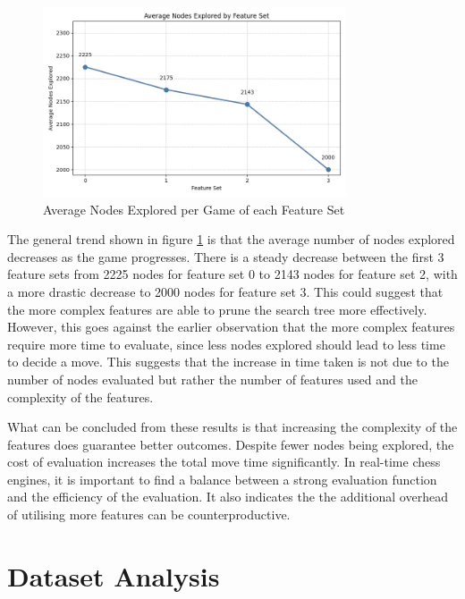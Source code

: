 \begin{figure}[H]
    \centering
    \includegraphics[width=0.8\textwidth]{images/plots/featureSet/Feature_set_vs_avg_nodes_explored.png}
    \caption{Average Nodes Explored per Game of each Feature Set}
    \label{fig: feature_set_vs_avg_nodes_explored}
\end{figure}

The general trend shown in figure \ref{fig: feature_set_vs_avg_nodes_explored} is that the average number of nodes explored decreases as the game progresses. There is a steady decrease between the first 3 feature sets from 2225 nodes for feature set 0 to 2143 nodes for feature set 2, with a more drastic decrease to 2000 nodes for feature set 3. This could suggest that the more complex features are able to prune the search tree more effectively. However, this goes against the earlier observation that the more complex features require more time to evaluate, since less nodes explored should lead to less time to decide a move. This suggests that the increase in time taken is not due to the number of nodes evaluated but rather the number of features used and the complexity of the features. 

What can be concluded from these results is that increasing the complexity of the features does  guarantee better outcomes. Despite fewer nodes being explored, the cost of evaluation increases the total move time significantly. In real-time chess engines, it is important to find a balance between a strong evaluation function and the efficiency of the evaluation. It also indicates the the additional overhead of utilising more features can be counterproductive.

\section{Dataset Analysis}


